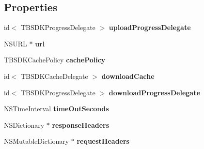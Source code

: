 \subsection*{Properties}
\begin{DoxyCompactItemize}
\item 
\mbox{\label{interface_t_b_s_d_k_connection_a40eeac81d019e089469ba0edf981c911}} 
id$<$ T\+B\+S\+D\+K\+Progress\+Delegate $>$ {\bfseries upload\+Progress\+Delegate}
\item 
\mbox{\label{interface_t_b_s_d_k_connection_ab16563b0d8b28260a0a5d09b360ad1ad}} 
N\+S\+U\+RL $\ast$ {\bfseries url}
\item 
\mbox{\label{interface_t_b_s_d_k_connection_ad93a41035386cc622336420077e93a6c}} 
T\+B\+S\+D\+K\+Cache\+Policy {\bfseries cache\+Policy}
\item 
\mbox{\label{interface_t_b_s_d_k_connection_ae1efe4bea3fb943f56672721f7251780}} 
id$<$ T\+B\+S\+D\+K\+Cache\+Delegate $>$ {\bfseries download\+Cache}
\item 
\mbox{\label{interface_t_b_s_d_k_connection_ae9a6201117a865a3ed5fe258d40d9f46}} 
id$<$ T\+B\+S\+D\+K\+Progress\+Delegate $>$ {\bfseries download\+Progress\+Delegate}
\item 
\mbox{\label{interface_t_b_s_d_k_connection_aa1e6f5eb1c5f316f09ad322ca1bd430e}} 
N\+S\+Time\+Interval {\bfseries time\+Out\+Seconds}
\item 
\mbox{\label{interface_t_b_s_d_k_connection_a505822d75a9b940be42c37a1f4fb86ed}} 
N\+S\+Dictionary $\ast$ {\bfseries response\+Headers}
\item 
\mbox{\label{interface_t_b_s_d_k_connection_a95fcbbe396c094f07c533b6aa6a9615a}} 
N\+S\+Mutable\+Dictionary $\ast$ {\bfseries request\+Headers}
\item 
\mbox{\label{interface_t_b_s_d_k_connection_aebf379168e4e12c020597eb79307dbfd}} 

\end{DoxyCompactItemize}

